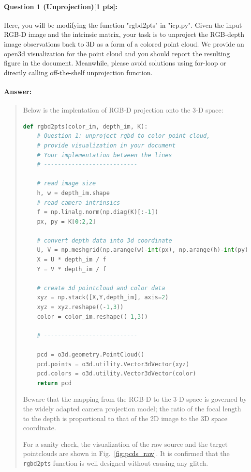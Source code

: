 \documentclass[11pt]{article}
\begin{document}
\paragraph{Question 1 (Unprojection)[1 pts]:} Here, you will be modifying the function "rgbd2pts" in "icp.py". Given the input RGB-D image and the intrinsic matrix, your task is to unproject the RGB-depth image observations back to 3D as a form of a colored point cloud. We provide an open3d visualization for the point cloud and you should report the resulting figure in the document. Meanwhile, please avoid solutions using for-loop or directly calling off-the-shelf unprojection function.
\paragraph{Answer:} 
\begin{quote}

Below is the implentation of RGB-D projection onto the 3-D space:

\begin{lstlisting}[language=Python, basicstyle=\scriptsize]
def rgbd2pts(color_im, depth_im, K):
    # Question 1: unproject rgbd to color point cloud, 
    # provide visualization in your document
    # Your implementation between the lines
    # ---------------------------
  
    # read image size 
    h, w = depth_im.shape 
    # read camera intrinsics
    f = np.linalg.norm(np.diag(K)[:-1])
    px, py = K[0:2,2]
  
    # convert depth data into 3d coordinate
    U, V = np.meshgrid(np.arange(w)-int(px), np.arange(h)-int(py))
    X = U * depth_im / f
    Y = V * depth_im / f
    
    # create 3d pointcloud and color data
    xyz = np.stack([X,Y,depth_im], axis=2)
    xyz = xyz.reshape((-1,3))
    color = color_im.reshape((-1,3))
    
    # ---------------------------
    
    pcd = o3d.geometry.PointCloud()
    pcd.points = o3d.utility.Vector3dVector(xyz)
    pcd.colors = o3d.utility.Vector3dVector(color)
    return pcd
\end{lstlisting}

Beware that the mapping from the RGB-D to the 3-D space is governed by the widely adapted camera projection model; the ratio of the focal length to the depth is proportional to that of the 2D image to the 3D space coordinate. 

For a sanity check, the visualization of the raw source and the target pointclouds are shown in Fig.~\ref{fig:pcds_raw}. It is confirmed that the \texttt{rgbd2pts} function is well-designed without causing any glitch.


\end{quote}
\end{document}
